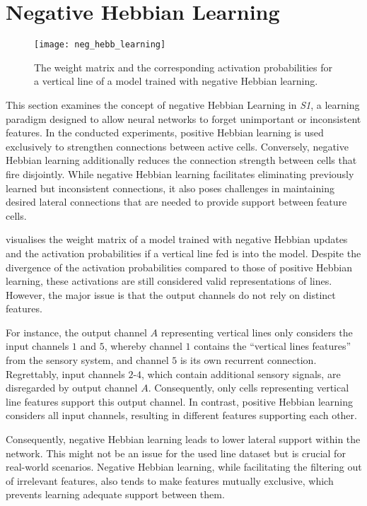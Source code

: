 \chapter{Negative Hebbian Learning}
%
\begin{figure}[h]
    \centering
    \texttt{[image: neg\_hebb\_learning]}
    \caption[Weight matrix and activations with negative Hebbian learning]{The weight matrix and the corresponding activation probabilities for a vertical line of a model trained with negative Hebbian learning.}
\end{figure}
%
This section examines the concept of negative Hebbian Learning in \emph{S1}, a learning paradigm designed to allow neural networks to forget unimportant or inconsistent features. 
In the conducted experiments, positive Hebbian learning is used exclusively to strengthen connections between active cells.
Conversely, negative Hebbian learning additionally reduces the connection strength between cells that fire disjointly.
While negative Hebbian learning facilitates eliminating previously learned but inconsistent connections, it also poses challenges in maintaining desired lateral connections that are needed to provide support between feature cells.


 visualises the weight matrix of a model trained with negative Hebbian updates and the activation probabilities if a vertical line fed is into the model.
Despite the divergence of the activation probabilities compared to those of positive Hebbian learning, these activations are still considered valid representations of lines.
However, the major issue is that the output channels do not rely on distinct features.

For instance, the output channel $A$ representing vertical lines only considers the input channels $1$ and $5$, whereby channel $1$ contains the ``vertical lines features'' from the sensory system, and channel $5$ is its own recurrent connection.
Regrettably, input channels $2$-$4$, which contain additional sensory signals, are disregarded by output channel $A$. Consequently, only cells representing vertical line features support this output channel.
In contrast, positive Hebbian learning considers all input channels, resulting in different features supporting each other.

Consequently, negative Hebbian learning leads to lower lateral support within the network.
This might not be an issue for the used line dataset but is crucial for real-world scenarios.
Negative Hebbian learning, while facilitating the filtering out of irrelevant features, also tends to make features mutually exclusive, which prevents learning adequate support between them.

